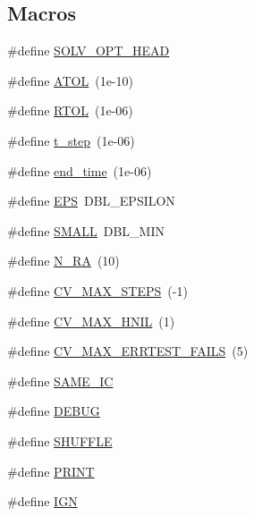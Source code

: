 \subsection*{Macros}
\begin{DoxyCompactItemize}
\item 
\#define \hyperlink{solver__options_8cuh_a0cdb20d794f10fb22eebe8854ae6aa45}{S\+O\+L\+V\+\_\+\+O\+P\+T\+\_\+\+H\+E\+AD}
\item 
\#define \hyperlink{solver__options_8cuh_a29a15cd00b37b1f4a5b4ec9f07c742f4}{A\+T\+OL}~(1e-\/10)
\item 
\#define \hyperlink{solver__options_8cuh_af50ac611d9fae906f9419504fd2caa5d}{R\+T\+OL}~(1e-\/06)
\item 
\#define \hyperlink{solver__options_8cuh_aaeb7127cf3bf0b49cec6554fbc101866}{t\+\_\+step}~(1e-\/06)
\item 
\#define \hyperlink{solver__options_8cuh_a25526ead9bdb589c90e7a8d3b4d1a746}{end\+\_\+time}~(1e-\/06)
\item 
\#define \hyperlink{solver__options_8cuh_a6ebf6899d6c1c8b7b9d09be872c05aae}{E\+PS}~D\+B\+L\+\_\+\+E\+P\+S\+I\+L\+ON
\item 
\#define \hyperlink{solver__options_8cuh_a09c78d2f8feb311dd9fc969a0bf84979}{S\+M\+A\+LL}~D\+B\+L\+\_\+\+M\+IN
\item 
\#define \hyperlink{solver__options_8cuh_a69f5533c684b73d07a7e20146a285cb1}{N\+\_\+\+RA}~(10)
\item 
\#define \hyperlink{solver__options_8cuh_a8dd330cbca99d70609ccc451d9099383}{C\+V\+\_\+\+M\+A\+X\+\_\+\+S\+T\+E\+PS}~(-\/1)
\item 
\#define \hyperlink{solver__options_8cuh_af45d9c410d5d7c99d2692080832d506e}{C\+V\+\_\+\+M\+A\+X\+\_\+\+H\+N\+IL}~(1)
\item 
\#define \hyperlink{solver__options_8cuh_ac42e0287ba619ab25b7d767a81f48082}{C\+V\+\_\+\+M\+A\+X\+\_\+\+E\+R\+R\+T\+E\+S\+T\+\_\+\+F\+A\+I\+LS}~(5)
\item 
\#define \hyperlink{solver__options_8cuh_aa98acf0dc83a3dce3ba168d75a74cb1b}{S\+A\+M\+E\+\_\+\+IC}
\item 
\#define \hyperlink{solver__options_8cuh_ad72dbcf6d0153db1b8d8a58001feed83}{D\+E\+B\+UG}
\item 
\#define \hyperlink{solver__options_8cuh_a0b43a0be2f674fea3218e7fb5221db1f}{S\+H\+U\+F\+F\+LE}
\item 
\#define \hyperlink{solver__options_8cuh_a8b43bafee90b30676faae508c21cb8d7}{P\+R\+I\+NT}
\item 
\#define \hyperlink{solver__options_8cuh_af5cccef89d39980a452b7f3a7c59fb53}{I\+GN}

\end{DoxyCompactItemize}
